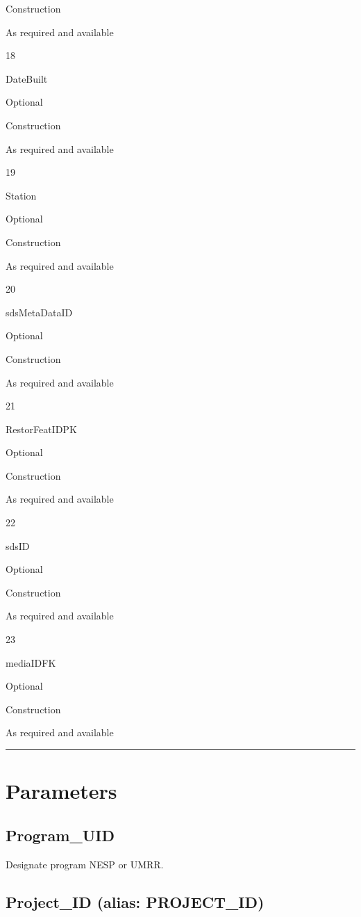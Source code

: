\documentclass[
  letterpaper,
  DIV=11,
  numbers=noendperiod]{scrreprt}
\begin{document}
Construction

As required and available

18

DateBuilt

Optional

Construction

As required and available

19

Station

Optional

Construction

As required and available

20

sdsMetaDataID

Optional

Construction

As required and available

21

RestorFeatIDPK

Optional

Construction

As required and available

22

sdsID

Optional

Construction

As required and available

23

mediaIDFK

Optional

Construction

As required and available

\begin{center}\rule{0.5\linewidth}{0.5pt}\end{center}

\section{Parameters}\label{parameters-10}

\subsection{Program\_UID}\label{program_uid-10}

Designate program NESP or UMRR.

\subsection{Project\_ID (alias:
PROJECT\_ID)}\label{project_id-alias-project_id-10}
\end{document}
